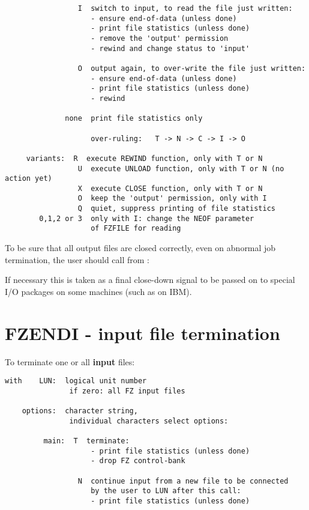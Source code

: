 {\begin{verbatim}
                 I  switch to input, to read the file just written:
                    - ensure end-of-data (unless done)
                    - print file statistics (unless done)
                    - remove the 'output' permission
                    - rewind and change status to 'input'

                 O  output again, to over-write the file just written:
                    - ensure end-of-data (unless done)
                    - print file statistics (unless done)
                    - rewind

              none  print file statistics only

                    over-ruling:   T -> N -> C -> I -> O

     variants:  R  execute REWIND function, only with T or N
                 U  execute UNLOAD function, only with T or N (no action yet)
                 X  execute CLOSE function, only with T or N
                 O  keep the 'output' permission, only with I
                 Q  quiet, suppress printing of file statistics
        0,1,2 or 3  only with I: change the NEOF parameter
                    of FZFILE for reading
\end{verbatim}
To be sure that all output files are closed correctly,
even on abnormal job termination,
the user should call from : \qquad{}

If necessary this is taken as a final close-down signal
to be passed on to special I/O packages on some machines
(such as  on IBM).

\section{FZENDI - input file termination}

To terminate one or all \textbf{input} files:


\begin{verbatim}
with    LUN:  logical unit number
               if zero: all FZ input files

    options:  character string,
               individual characters select options:

         main:  T  terminate:
                    - print file statistics (unless done)
                    - drop FZ control-bank

                 N  continue input from a new file to be connected
                    by the user to LUN after this call:
                    - print file statistics (unless done)


\end{verbatim}}
